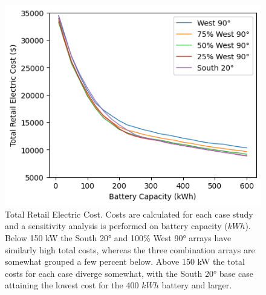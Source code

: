 \documentclass[conference]{IEEEtran}
\begin{document}
\begin{figure}
    \centering
    \includegraphics[width=0.75\linewidth]{images/total cost.png}
    \caption{Total Retail Electric Cost. Costs are calculated for each case study and a sensitivity analysis is performed on battery capacity ($kWh$). Below 150 kW the South 20° and 100\% West 90° arrays have similarly high total costs, whereas the three combination arrays are somewhat grouped a few percent below. Above 150 kW the total costs for each case diverge somewhat, with the South 20° base case attaining the lowest cost for the 400 $kWh$ battery and larger.}
    \label{fig:total-cost}
\end{figure}
\end{document}

